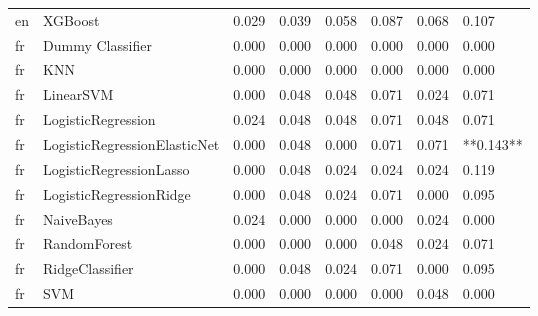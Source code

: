 \begin{tabular}{llllllll}
      en &                      XGBoost & 0.029 &                     0.039 &                 0.058 &                  0.087 &                                   0.068 &     0.107 \\
      fr &             Dummy Classifier & 0.000 &                     0.000 &                 0.000 &                  0.000 &                                   0.000 &     0.000 \\
      fr &                          KNN & 0.000 &                     0.000 &                 0.000 &                  0.000 &                                   0.000 &     0.000 \\
      fr &                    LinearSVM & 0.000 &                     0.048 &                 0.048 &                  0.071 &                                   0.024 &     0.071 \\
      fr &           LogisticRegression & 0.024 &                     0.048 &                 0.048 &                  0.071 &                                   0.048 &     0.071 \\
      fr & LogisticRegressionElasticNet & 0.000 &                     0.048 &                 0.000 &                  0.071 &                                   0.071 & **0.143** \\
      fr &      LogisticRegressionLasso & 0.000 &                     0.048 &                 0.024 &                  0.024 &                                   0.024 &     0.119 \\
      fr &      LogisticRegressionRidge & 0.000 &                     0.048 &                 0.024 &                  0.071 &                                   0.000 &     0.095 \\
      fr &                   NaiveBayes & 0.024 &                     0.000 &                 0.000 &                  0.000 &                                   0.024 &     0.000 \\
      fr &                 RandomForest & 0.000 &                     0.000 &                 0.000 &                  0.048 &                                   0.024 &     0.071 \\
      fr &              RidgeClassifier & 0.000 &                     0.048 &                 0.024 &                  0.071 &                                   0.000 &     0.095 \\
      fr &                          SVM & 0.000 &                     0.000 &                 0.000 &                  0.000 &                                   0.048 &     0.000 \\

\end{tabular}

